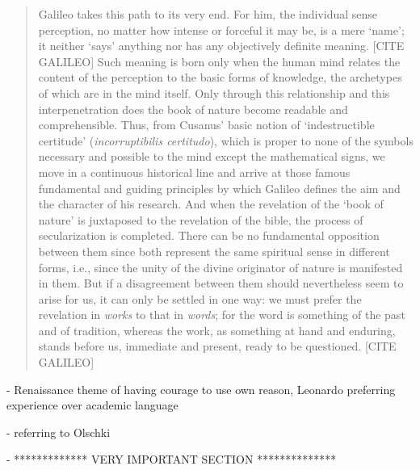 \begin{quote}
    Galileo takes this path to its very end.  For him, the individual sense perception, no matter how intense or forceful it may be, is a mere `name'; it neither `says' anything nor has any objectively definite meaning.  [CITE GALILEO]  Such meaning is born only when the human mind relates the content of the perception to the basic forms of knowledge, the archetypes of which are in the mind itself.  Only through this relationship and this interpenetration does the book of nature become readable and comprehensible.  Thus, from Cusanus' basic notion of `indestructible certitude' (\emph{incorruptibilis certitudo}), which is proper to none of the symbols necessary and possible to the mind except the mathematical signs, we move in a continuous historical line and arrive at those famous fundamental and guiding principles by which Galileo defines the aim and the character of his research.  And when the revelation of the `book of nature' is juxtaposed to the revelation of the bible, the process of secularization is completed.  There can be no fundamental opposition between them since both represent the same spiritual sense in different forms, i.e., since the unity of the divine originator of nature is manifested in them.  But if a disagreement between them should nevertheless seem to arise for us, it can only be settled in one way: we must prefer the revelation in \emph{works} to that in \emph{words}; for the word is something of the past and of tradition, whereas the work, as something at hand and enduring, stands before us, immediate and present, ready to be questioned. [CITE GALILEO]

    \citep[p. 53-55]{Cassirer1927}
\end{quote}

- Renaissance theme of having courage to use own reason, Leonardo preferring experience over academic language

- referring to Olschki

- ************* VERY IMPORTANT SECTION **************

